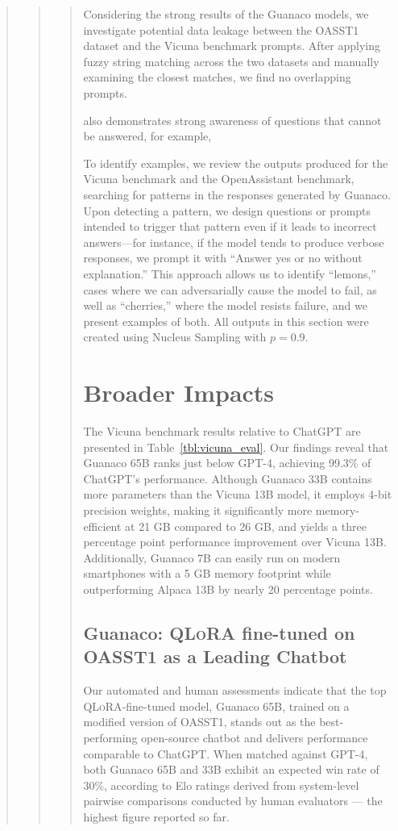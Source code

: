 \begin{quote}
\begin{quote}
\begin{quote}
Considering the strong results of the {Guanaco} models, we investigate potential data leakage between the OASST1 dataset and the Vicuna benchmark prompts. After applying fuzzy string matching across the two datasets and manually examining the closest matches, we find no overlapping prompts.

 also demonstrates strong awareness of questions that cannot be answered, for example,

To identify examples, we review the outputs produced for the Vicuna benchmark and the OpenAssistant benchmark, searching for patterns in the responses generated by {Guanaco}. Upon detecting a pattern, we design questions or prompts intended to trigger that pattern even if it leads to incorrect answers—for instance, if the model tends to produce verbose responses, we prompt it with “Answer yes or no without explanation.” This approach allows us to identify “lemons,” cases where we can adversarially cause the model to fail, as well as “cherries,” where the model resists failure, and we present examples of both. All outputs in this section were created using Nucleus Sampling \cite{holtzmancurious} with $p=0.9$.

\section{Broader Impacts}

The Vicuna benchmark \cite{vicuna2023} results relative to ChatGPT are presented in Table~\ref{tbl:vicuna_eval}. Our findings reveal that {Guanaco} 65B ranks just below GPT-4, achieving 99.3\% of ChatGPT's performance. Although {Guanaco} 33B contains more parameters than the Vicuna 13B model, it employs 4-bit precision weights, making it significantly more memory-efficient at 21 GB compared to 26 GB, and yields a three percentage point performance improvement over Vicuna 13B. Additionally, {Guanaco} 7B can easily run on modern smartphones with a 5 GB memory footprint while outperforming Alpaca 13B by nearly 20 percentage points.

\subsection{\textbf{Guanaco}: \textsc{QLoRA} fine-tuned on OASST1 as a Leading Chatbot} Our automated and human assessments indicate that the top \textsc{QLoRA}-fine-tuned model, {Guanaco} 65B, trained on a modified version of OASST1, stands out as the best-performing open-source chatbot and delivers performance comparable to ChatGPT. When matched against GPT-4, both {Guanaco} 65B and 33B exhibit an expected win rate of 30\%, according to Elo ratings derived from system-level pairwise comparisons conducted by human evaluators — the highest figure reported so far.


\end{quote}
\end{quote}
\end{quote}
